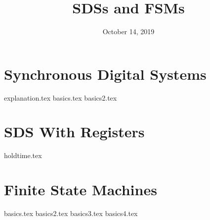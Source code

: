 \documentclass[11pt]{exam}
\title{SDSs and FSMs}
\date{October 14, 2019}
\begin{document}
\maketitle

\section{Synchronous Digital Systems}
\begin{questions}
{explanation.tex}
{basics.tex}
{basics2.tex}
\end{questions}
\newpage

\section{SDS With Registers}
\begin{questions}
{holdtime.tex}
\end{questions}
\newpage

\section{Finite State Machines}
\begin{questions}
{basics.tex}
{basics2.tex}
{basics3.tex}
{basics4.tex}
\end{questions}
\newpage
\end{document}
